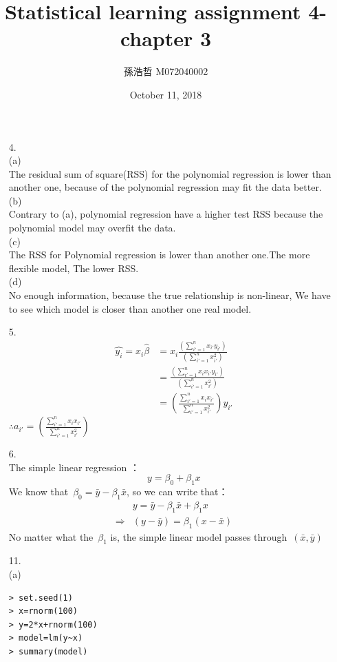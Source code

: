 \documentclass[12pt]{article}
\title{Statistical learning assignment 4- chapter 3}
\author{孫浩哲 \hspace{0.7cm} M072040002}
\date{October 11, 2018}
\begin{document}
\maketitle
\begin{itemize}
\item[4.]\ \\[2ex]
(a)\\[2ex]
The residual sum of square(RSS) for the polynomial regression is lower than another one, because of the polynomial regression may fit the data better.\\[3ex]
(b)\\[2ex]
Contrary to (a), polynomial regression have a higher test RSS because the polynomial model may overfit the data.\\[3ex]
(c)\\[2ex]
The RSS for Polynomial regression is lower than another one.The more flexible model, The lower RSS.\\[3ex]
(d)\\[2ex]
No enough information, because the true relationship is non-linear, We have to see which model is closer than another one real model.
\item[5.]
\begin{align*}
\hat{y_{i}}=x_{i}\hat{\beta}
&=x_{i}\frac{\left(\sum_{i'=1}^{n}x_{i'}y_{i'}\right)}{(\sum_{i'=1}^{n}x_{i'}^2)}\\
&=\frac{\left(\sum_{i'=1}^{n}x_{i}x_{i'}y_{i'}\right)}{(\sum_{i'=1}^{n}x_{i'}^2)}\\
&=\left(\frac{\sum_{i'=1}^{n}x_{i}x_{i'}}{\sum_{i'=1}^{n}x_{i'}^2}\right)y_{i'}
\end{align*}
$\therefore a_{i'}=\left(\frac{\sum_{i'=1}^{n}x_{i}x_{i'}}{\sum_{i'=1}^{n}x_{i'}^2}\right)$
\item[6.]\ \\[2ex]
The simple linear regression ：
\hspace{25pt}$$y=\beta_{0}+\beta_{1}x$$
We know that\ $\beta_{0}=\bar{y}-\beta_{1}\bar{x}$, so we can write that：
\begin{align*}
&y=\bar{y}-\beta_{1}\bar{x}+\beta_{1}x\\
\Rightarrow &(y-\bar{y})=\beta_{1}(x-\bar{x})
\end{align*}
No matter what the\ $\beta_{1}$ is, the simple linear model passes through\ $(\bar{x},\bar{y})$
\item[11.]\ \\[2ex]
(a)
\begin{verbatim}
> set.seed(1)
> x=rnorm(100)
> y=2*x+rnorm(100)
> model=lm(y~x)
> summary(model)


\end{verbatim}
\end{itemize}
\end{document}
